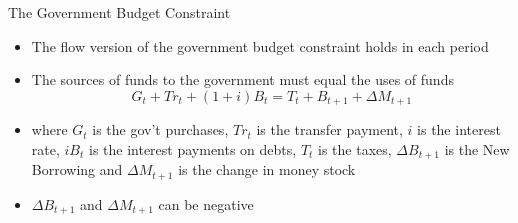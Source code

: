 \documentclass[aspectratio=1610]{beamer}
\begin{document}
\begin{frame}[wide]{The Government Budget Constraint}
	\begin{itemize}
		\item The flow version of the government budget constraint holds in each period
		\vspace{4mm}
		\item The sources of funds to the government must equal the uses of funds
		\vspace{1mm}
		\[G_t + Tr_t + (1+i)B_t = T_t + B_{t+1} + \Delta M_{t+1}\]
		\vspace{1mm}
		\item[] where $G_t$ is the gov't purchases, $Tr_t$ is the transfer payment, $i$ is the interest rate, $iB_t$ is the interest payments on debts, $T_t$ is the taxes, $\Delta B_{t+1}$ is the New Borrowing and $\Delta M_{t+1}$ is the change in money stock
		\vspace{4mm}
		\item $\Delta B_{t+1}$ and $\Delta M_{t+1}$ can be negative
	\end{itemize}
\end{frame}
\end{document}
